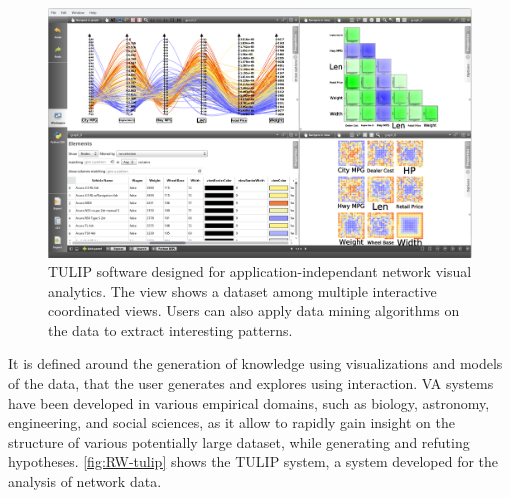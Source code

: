 \begin{figure}
    \centering %
    \includegraphics[width=1\textwidth]{static/figures/RelatedWork/TULIP}
    \caption{TULIP software designed for application-independant network visual analytics\cite{auberTULIP2017}. The view shows a dataset among multiple interactive coordinated views. Users can also apply data mining algorithms on the data to extract interesting patterns.}
    \label{fig:RW-tulip}
\end{figure}

It is defined around the generation of knowledge using visualizations and models of the data, that the user generates and explores using interaction.
VA systems have been developed in various empirical domains, such as biology, astronomy, engineering, and social sciences, as it allow to rapidly gain insight on the structure of various potentially large dataset, while generating and refuting hypotheses.
\autoref{fig:RW-tulip} shows the TULIP system, a \va system developed for the analysis of network data.





